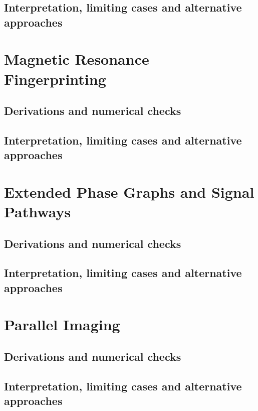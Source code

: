 \subsection{Interpretation, limiting cases and alternative approaches}
\par\pagebreak[1]

\section{Magnetic Resonance Fingerprinting}
\label{sec:e:magnetic-resonance-fingerprinting}
\subsection{Derivations and numerical checks}
\subsection{Interpretation, limiting cases and alternative approaches}
\par\pagebreak[1]

\section{Extended Phase Graphs and Signal Pathways}
\label{sec:e:extended-phase-graphs-and-signal-pathways}
\subsection{Derivations and numerical checks}
\subsection{Interpretation, limiting cases and alternative approaches}
\par\pagebreak[1]

\section{Parallel Imaging}
\label{sec:e:parallel-imaging}
\subsection{Derivations and numerical checks}
\subsection{Interpretation, limiting cases and alternative approaches}
\par\pagebreak[1]


